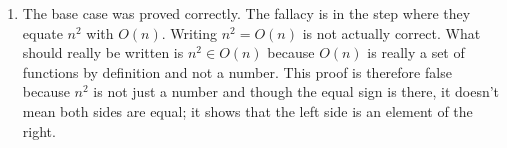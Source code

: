 \begin{enumerate}[1.]
\begin{itemize}
\begin{proof}
	\end{proof}
	\end{itemize}
	
\item The base case was proved correctly. The fallacy is in the step where they equate $n^2$ with $O(n)$. Writing $n^2=O(n)$ is not actually correct. What should really be written is $n^2 \in O(n)$ because $O(n)$ is really a set of functions by definition and not a number. This proof is therefore false because $n^2$ is not just a number and though the equal sign is there, it doesn't mean both sides are equal; it shows that the left side is an element of the right.

\end{enumerate}
